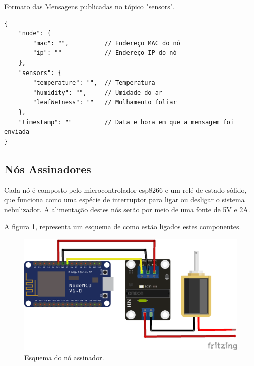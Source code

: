 \begin{quadro}[H]
\centering
\caption{Formato das Mensagens publicadas no tópico "sensors".}
\vspace{-\baselineskip}
\begin{verbatim}
{
    "node": {
        "mac": "",          // Endereço MAC do nó
        "ip": ""            // Endereço IP do nó
    },
    "sensors": {
        "temperature": "",  // Temperatura
        "humidity": "",     // Umidade do ar 
        "leafWetness": ""   // Molhamento foliar
    },
    "timestamp": ""         // Data e hora em que a mensagem foi enviada
}
\end{verbatim}
\label{tab:formato-mensagens}
\vspace{-1.2cm}
\end{quadro}


\subsection{Nós Assinadores}
Cada nó é composto pelo microcontrolador esp8266 e um relé de estado sólido, que funciona como uma espécie de interruptor para ligar ou desligar o sistema nebulizador. A alimentação destes nós serão por meio de uma fonte de 5V e 2A.

A figura \ref{fig:no-assinador}, representa um esquema de como estão ligados estes componentes.

\begin{figure}[H]
    \centering
    \includegraphics[scale=1]{04-figuras/subscriber_node.png}
    \caption{Esquema do nó assinador.}
    \vspace{-\baselineskip}
    \label{fig:no-assinador}
\end{figure}

